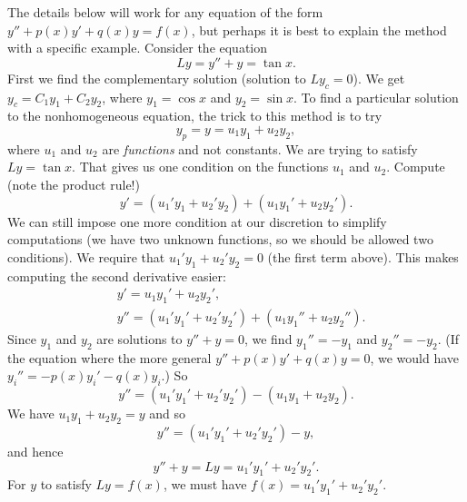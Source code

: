 The details below will work for any equation of the form
$y''+p(x)y' +q(x)y = f(x)$, but
perhaps it is best to explain the method with a specific example.
Consider the equation
\begin{equation*}
Ly = y''+y = \tan x .
\end{equation*}
First we find the complementary solution (solution to $Ly_c = 0$).  
We get $y_c = C_1 y_1 + C_2 y_2$, where $y_1 = \cos x$ and $y_2 = \sin x$.
To find a particular solution to the nonhomogeneous equation, 
the trick to this method is to try
\begin{equation*}
y_p = y = u_1 y_1 + u_2 y_2 ,
\end{equation*}
where $u_1$ and $u_2$ are \emph{functions} and not constants.
We are trying to satisfy $Ly = \tan x$.  That gives us one condition on the
functions $u_1$ and $u_2$.
Compute (note the product rule!)
\begin{equation*}
y' = (u_1' y_1 + u_2' y_2) + (u_1 y_1' + u_2 y_2').
\end{equation*}
We can still
impose one more condition at our discretion to simplify computations (we have two unknown functions,
so we should be allowed two conditions).  We require that
$u_1' y_1 + u_2' y_2 = 0$ (the first term above).
This makes computing the second derivative easier:
\begin{align*}
& y' = u_1 y_1' + u_2 y_2' , \\
& y'' = (u_1' y_1' + u_2' y_2') + (u_1 y_1'' + u_2 y_2'') .
\end{align*}
Since $y_1$ and $y_2$ are solutions to $y''+y = 0$, we find
$y_1'' = - y_1$
and $y_2'' = - y_2$.
(If the equation where the more general
$y''+p(x)y' +q(x)y = 0$, we would have
$y_i'' = -p(x)y_i' -q(x)y_i$.) So 
\begin{equation*}
y'' = (u_1' y_1' + u_2' y_2') - (u_1 y_1 + u_2 y_2) .
\end{equation*}
We have $u_1 y_1 + u_2 y_2 = y$ and so
\begin{equation*}
y'' = (u_1' y_1' + u_2' y_2') - y ,
\end{equation*}
and hence
\begin{equation*}
y'' + y = Ly = u_1' y_1' + u_2' y_2' .
\end{equation*}
For $y$ to satisfy $Ly = f(x)$, we must have
$f(x) = u_1' y_1' + u_2' y_2'$.

